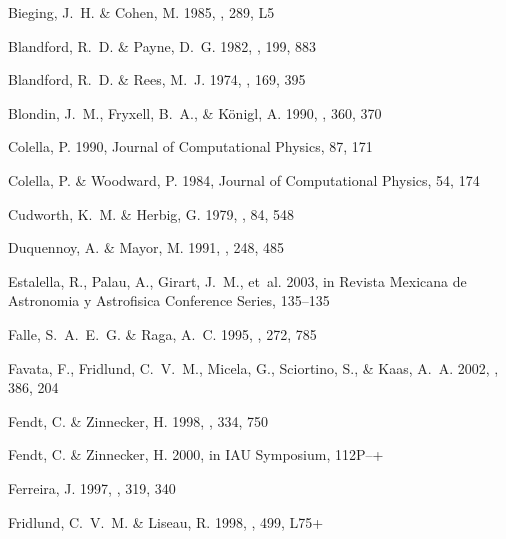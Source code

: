 \documentclass{aa}
\begin{document}
\begin{thebibliography}{80}
{Bieging}, J.~H. \& {Cohen}, M. 1985, \apjl, 289, L5

{Blandford}, R.~D. \& {Payne}, D.~G. 1982, \mnras, 199, 883

{Blandford}, R.~D. \& {Rees}, M.~J. 1974, \mnras, 169, 395

{Blondin}, J.~M., {Fryxell}, B.~A., \& {K\"onigl}, A. 1990, \apj, 360, 370

Colella, P. 1990, Journal of Computational Physics, 87, 171

Colella, P. \& Woodward, P. 1984, Journal of Computational Physics, 54, 174

{Cudworth}, K.~M. \& {Herbig}, G. 1979, \aj, 84, 548

{Duquennoy}, A. \& {Mayor}, M. 1991, \aap, 248, 485

{Estalella}, R., {Palau}, A., {Girart}, J.~M., {et~al.} 2003, in Revista
  Mexicana de Astronomia y Astrofisica Conference Series, 135--135

{Falle}, S.~A.~E.~G. \& {Raga}, A.~C. 1995, \mnras, 272, 785

{Favata}, F., {Fridlund}, C.~V.~M., {Micela}, G., {Sciortino}, S., \& {Kaas},
  A.~A. 2002, \aap, 386, 204

{Fendt}, C. \& {Zinnecker}, H. 1998, \aap, 334, 750

{Fendt}, C. \& {Zinnecker}, H. 2000, in IAU Symposium, 112P--+

{Ferreira}, J. 1997, \aap, 319, 340

{Fridlund}, C.~V.~M. \& {Liseau}, R. 1998, \apjl, 499, L75+


\end{thebibliography}
\end{document}
